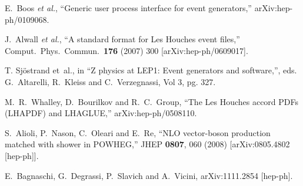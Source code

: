 \documentclass[paper]{JHEP3}
\begin{document}
\begin{thebibliography}{10}
  E.~Boos {\it et al.},
  ``Generic user process interface for event generators,''
  arXiv:hep-ph/0109068.

  J.~Alwall {\it et al.},
  ``A standard format for Les Houches event files,''
  Comput.\ Phys.\ Commun.\  {\bf 176} (2007) 300
  [arXiv:hep-ph/0609017].


 T. Sj\"ostrand et~al., in
  ``Z physics at LEP1: Event generators and software,'',  eds.
  G.~Altarelli, R.~Kleiss and C.~Verzegnassi, Vol 3, pg. 327.


  M.~R.~Whalley, D.~Bourilkov and R.~C.~Group,
  ``The Les Houches accord PDFs (LHAPDF) and LHAGLUE,''
  arXiv:hep-ph/0508110.


  S.~Alioli, P.~Nason, C.~Oleari and E.~Re,
  ``NLO vector-boson production matched with shower in POWHEG,''
  JHEP {\bf 0807}, 060 (2008)
  [arXiv:0805.4802 [hep-ph]].

  E.~Bagnaschi, G.~Degrassi, P.~Slavich and A.~Vicini,
  arXiv:1111.2854 [hep-ph].

\end{thebibliography}
\end{document}
